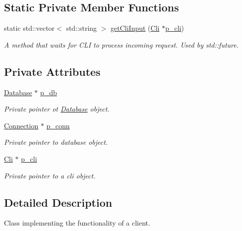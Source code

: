 \subsection*{Static Private Member Functions}
\begin{DoxyCompactItemize}
\item 
static std\+::vector$<$ std\+::string $>$ \hyperlink{classClient_a62807c316030505b03b90186d3b06a25}{get\+Cli\+Input} (\hyperlink{classCli}{Cli} $\ast$\hyperlink{classClient_a48826e6a4fbfb261da3782405cd2558e}{p\+\_\+cli})
\begin{DoxyCompactList}\small\item\em A method that waits for C\+LI to process incoming request. Used by std\+::future. \end{DoxyCompactList}\end{DoxyCompactItemize}
\subsection*{Private Attributes}
\begin{DoxyCompactItemize}
\item 
\hyperlink{classDatabase}{Database} $\ast$ \hyperlink{classClient_ac7963f918414b58d4c752fcbcc12d965}{p\+\_\+db}
\begin{DoxyCompactList}\small\item\em Private pointer ot \hyperlink{classDatabase}{Database} object. \end{DoxyCompactList}\item 
\hyperlink{classConnection}{Connection} $\ast$ \hyperlink{classClient_a086555f6a435428891d5f237cd454c88}{p\+\_\+conn}
\begin{DoxyCompactList}\small\item\em Private pointer to database object. \end{DoxyCompactList}\item 
\hyperlink{classCli}{Cli} $\ast$ \hyperlink{classClient_a48826e6a4fbfb261da3782405cd2558e}{p\+\_\+cli}
\begin{DoxyCompactList}\small\item\em Private pointer to a cli object. \end{DoxyCompactList}\end{DoxyCompactItemize}


\subsection{Detailed Description}
Class implementing the functionality of a client. 

